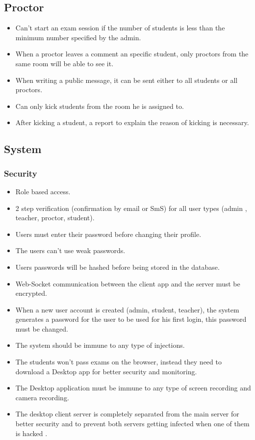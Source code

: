 \documentclass[]{uc2pfecaneva}
\begin{document}
\raggedright\subsection{Proctor}
\begin{itemize}
\item Can’t start an exam session if the number of students is less than the minimum number specified by the admin.
\item When a proctor leaves a comment an specific student, only proctors from the same room will be able to see it.
\item When writing a public message, it can be sent either to all students or all proctors.
\item Can only kick students from the room he is assigned to.
\item After kicking a student, a report to explain the reason of kicking is necessary.
\end{itemize}


\raggedright\subsection{System}

\raggedright\subsubsection{Security}
\begin{itemize}
	\item Role based access.
	\item 2 step verification (confirmation by email or SmS) for all user types (admin , teacher, proctor, student).
	\item Users must enter their password before changing their profile.
	\item The users can't use weak passwords.
	\item Users passwords will be hashed before being stored in the database.
	\item Web-Socket communication between the client app and the server must be encrypted.
	\item When a new user account is created (admin, student, teacher), the system generates a password for the user to be used for his first login, this password must be changed.
	\item The system should be immune to any type of injections.
	\item The students won’t pass exams on the browser, instead they need to download a Desktop app for better security and monitoring.
	\item The Desktop application must be immune to any type of screen recording and camera recording.
	\item The desktop client server is completely separated from the main server for better security and to prevent both servers getting infected when one of them is hacked .
\end{itemize}
\end{document}
